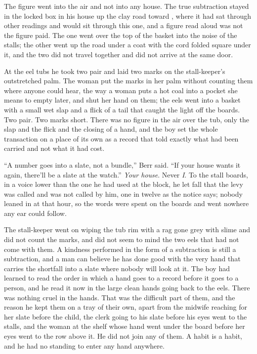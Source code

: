 The figure went into the air and not into any house. The true subtraction stayed in the locked box in his house up the clay road toward , where it had sat through other readings and would sit through this one, and a figure read aloud was not the figure paid. The one went over the top of the basket into the noise of the stalls; the other went up the road under a coat with the cord folded square under it, and the two did not travel together and did not arrive at the same door.

At the eel tubs he took two pair and laid two marks on the stall-keeper's outstretched palm. The woman put the marks in her palm without counting them where anyone could hear, the way a woman puts a hot coal into a pocket she means to empty later, and shut her hand on them; the eels went into a basket with a small wet slap and a flick of a tail that caught the light off the boards. Two pair. Two marks short. There was no figure in the air over the tub, only the slap and the flick and the closing of a hand, and the boy set the whole transaction on a place of its own as a record that told exactly what had been carried and not what it had cost.

“A number goes into a slate, not a bundle,” Berr said. “If your house wants it again, there'll be a slate at the watch.” \emph{Your house}. Never \emph{I}. To the stall boards, in a voice lower than the one he had used at the block, he let fall that the levy was called and was not called by him, one in twelve as the notice says; nobody leaned in at that hour, so the words were spent on the boards and went nowhere any ear could follow.

The stall-keeper went on wiping the tub rim with a rag gone grey with slime and did not count the marks, and did not seem to mind the two eels that had not come with them. A kindness performed in the form of a subtraction is still a subtraction, and a man can believe he has done good with the very hand that carries the shortfall into a slate where nobody will look at it. The boy had learned to read the order in which a hand goes to a record before it goes to a person, and he read it now in the large clean hands going back to the eels. There was nothing cruel in the hands. That was the difficult part of them, and the reason he kept them on a tray of their own, apart from the midwife reaching for her slate before the child, the clerk going to his slate before his eyes went to the stalls, and the woman at the shelf whose hand went under the board before her eyes went to the row above it. He did not join any of them. A habit is a habit, and he had no standing to enter any hand anywhere.

